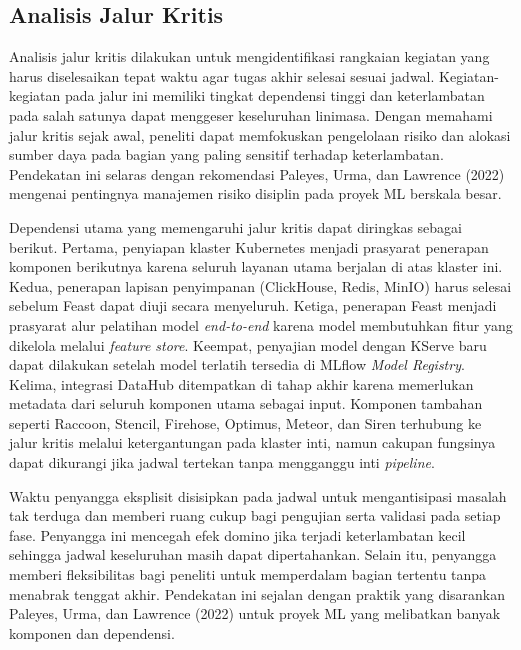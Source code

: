 

\vspace{-0.5cm}

\subsection{Analisis Jalur Kritis}

Analisis jalur kritis dilakukan untuk mengidentifikasi rangkaian kegiatan yang harus diselesaikan tepat waktu agar tugas akhir selesai sesuai jadwal. Kegiatan-kegiatan pada jalur ini memiliki tingkat dependensi tinggi dan keterlambatan pada salah satunya dapat menggeser keseluruhan linimasa. Dengan memahami jalur kritis sejak awal, peneliti dapat memfokuskan pengelolaan risiko dan alokasi sumber daya pada bagian yang paling sensitif terhadap keterlambatan. Pendekatan ini selaras dengan rekomendasi Paleyes, Urma, dan Lawrence (2022) mengenai pentingnya manajemen risiko disiplin pada proyek ML berskala besar.

Dependensi utama yang memengaruhi jalur kritis dapat diringkas sebagai berikut. Pertama, penyiapan klaster Kubernetes menjadi prasyarat penerapan komponen berikutnya karena seluruh layanan utama berjalan di atas klaster ini. Kedua, penerapan lapisan penyimpanan (ClickHouse, Redis, MinIO) harus selesai sebelum Feast dapat diuji secara menyeluruh. Ketiga, penerapan Feast menjadi prasyarat alur pelatihan model \textit{end-to-end} karena model membutuhkan fitur yang dikelola melalui \textit{feature store}. Keempat, penyajian model dengan KServe baru dapat dilakukan setelah model terlatih tersedia di MLflow \textit{Model Registry}. Kelima, integrasi DataHub ditempatkan di tahap akhir karena memerlukan metadata dari seluruh komponen utama sebagai input. Komponen tambahan seperti Raccoon, Stencil, Firehose, Optimus, Meteor, dan Siren terhubung ke jalur kritis melalui ketergantungan pada klaster inti, namun cakupan fungsinya dapat dikurangi jika jadwal tertekan tanpa mengganggu inti \textit{pipeline}.

Waktu penyangga eksplisit disisipkan pada jadwal untuk mengantisipasi masalah tak terduga dan memberi ruang cukup bagi pengujian serta validasi pada setiap fase. Penyangga ini mencegah efek domino jika terjadi keterlambatan kecil sehingga jadwal keseluruhan masih dapat dipertahankan. Selain itu, penyangga memberi fleksibilitas bagi peneliti untuk memperdalam bagian tertentu tanpa menabrak tenggat akhir. Pendekatan ini sejalan dengan praktik yang disarankan Paleyes, Urma, dan Lawrence (2022) untuk proyek ML yang melibatkan banyak komponen dan dependensi.

